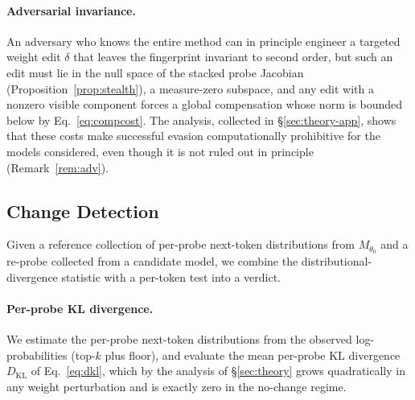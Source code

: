 \documentclass[11pt]{article}
\theoremstyle{definition}
\begin{document}
\paragraph{Adversarial invariance.}
An adversary who knows the entire method can in principle engineer a targeted
weight edit $\delta$ that leaves the fingerprint invariant to second order, but
such an edit must lie in the null space of the stacked probe Jacobian
(Proposition~\ref{prop:stealth}), a measure-zero subspace, and any edit with a
nonzero visible component forces a global compensation whose norm is bounded
below by Eq.~\eqref{eq:compcost}. The analysis, collected in
\S\ref{sec:theory-app}, shows that these costs make successful evasion
computationally prohibitive for the models considered, even though it is not
ruled out in principle (Remark~\ref{rem:adv}).
\subsection{Change Detection}
\label{sec:detect}

Given a reference collection of per-probe next-token distributions from
$M_{\theta_0}$ and a re-probe collected from a candidate model, we combine the
distributional-divergence statistic with a per-token test into a verdict.

\paragraph{Per-probe KL divergence.}
We estimate the per-probe next-token distributions from the observed
log-probabilities (top-$k$ plus floor), and evaluate the mean per-probe KL
divergence $D_{\mathrm{KL}}$ of Eq.~\eqref{eq:dkl}, which by the analysis of
\S\ref{sec:theory} grows quadratically in any weight perturbation and is
exactly zero in the no-change regime.
\end{document}
